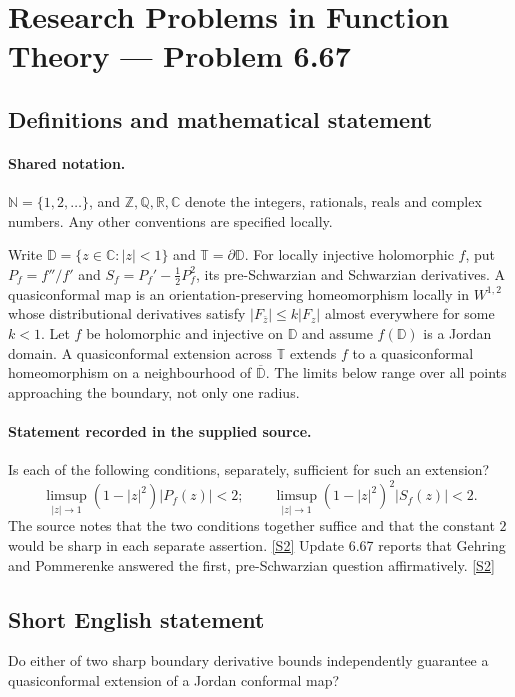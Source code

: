 \documentclass[11pt]{article}
\newcommand{\sref}[2]{\hyperlink{source:#1:#2}{[S#2]}}
\begin{document}
\section{Research Problems in Function Theory — Problem 6.67}\label{statement}

\subsection{Definitions and mathematical statement}

\paragraph{Shared notation.}$\mathbb N=\{1,2,\ldots\}$, and $\mathbb Z,\mathbb Q,\mathbb R,\mathbb C$ denote the integers, rationals, reals and complex numbers. Any other conventions are specified locally.


Write $\mathbb D=\{z\in\mathbb C:|z|<1\}$ and $\mathbb T=\partial\mathbb D$. For locally injective holomorphic $f$, put $P_f=f''/f'$ and $S_f=P_f'-\tfrac12P_f^2$, its pre-Schwarzian and Schwarzian derivatives. A quasiconformal map is an orientation-preserving homeomorphism locally in $W^{1,2}$ whose distributional derivatives satisfy $|F_{\bar z}|\le k|F_z|$ almost everywhere for some $k<1$. Let $f$ be holomorphic and injective on $\mathbb D$ and assume $f(\mathbb D)$ is a Jordan domain. A quasiconformal extension across $\mathbb T$ extends $f$ to a quasiconformal homeomorphism on a neighbourhood of $\overline{\mathbb D}$. The limits below range over all points approaching the boundary, not only one radius.
\paragraph{Statement recorded in the supplied source.}
Is each of the following conditions, separately, sufficient for such an extension? \[\limsup_{|z|\to1}(1-|z|^2)|P_f(z)|<2;\qquad \limsup_{|z|\to1}(1-|z|^2)^2|S_f(z)|<2.\] The source notes that the two conditions together suffice and that the constant $2$ would be sharp in each separate assertion. \sref{statement}{2}
Update 6.67 reports that Gehring and Pommerenke answered the first, pre-Schwarzian question affirmatively. \sref{statement}{2}
\subsection{Short English statement}
Do either of two sharp boundary derivative bounds independently guarantee a quasiconformal extension of a Jordan conformal map?
\end{document}
